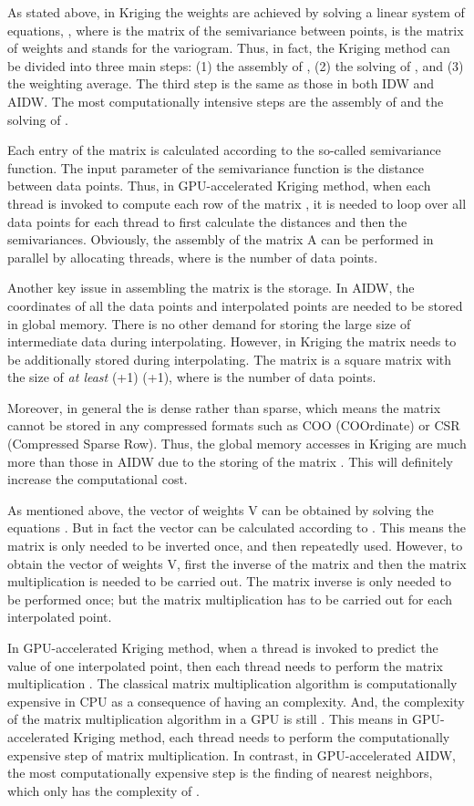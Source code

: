 \documentclass[fleqn,11pt]{wlscirep}
\begin{document}
As stated above, in Kriging the weights are achieved by solving a linear 
system of equations, , where  is the matrix of the semivariance 
between points,  is the matrix of weights and  stands for the variogram. 
Thus, in fact, the Kriging method can be divided into three main steps: (1) 
the assembly of , (2) the solving of , and (3) the weighting average. 
The third step is the same as those in both IDW and AIDW. The most 
computationally intensive steps are the assembly of  and the solving of .

Each entry of the matrix  is calculated according to the so-called 
semivariance function. The input parameter of the semivariance function is 
the distance between data points. Thus, in GPU-accelerated Kriging method, 
when each thread is invoked to compute each row of the matrix , it is 
needed to loop over all data points for each thread to first calculate the 
distances and then the semivariances. Obviously, the assembly of the matrix 
A can be performed in parallel by allocating  threads, where  is the number 
of data points.

Another key issue in assembling the matrix  is the storage. In AIDW, the 
coordinates of all the data points and interpolated points are needed to be 
stored in global memory. There is no other demand for storing the large size 
of intermediate data during interpolating. However, in Kriging the matrix  
needs to be additionally stored during interpolating. The matrix  is a 
square matrix with the size of \textit{at least} (+1) (+1), where  is the number of 
data points. 

Moreover, in general the  is dense rather than sparse, which means the 
matrix  cannot be stored in any compressed formats such as COO (COOrdinate) 
or CSR (Compressed Sparse Row). Thus, the global memory accesses in Kriging 
are much more than those in AIDW due to the storing of the matrix . This 
will definitely increase the computational cost. 

As mentioned above, the vector of weights V can be obtained by solving the 
equations . But in fact the vector can be calculated according to 
. This means the matrix  is only needed to be inverted once, and 
then repeatedly used. However, to obtain the vector of weights V, first the 
inverse of the matrix  and then the matrix multiplication is needed to be 
carried out. The matrix inverse is only needed to be performed once; but the 
matrix multiplication has to be carried out for each interpolated point.

In GPU-accelerated Kriging method, when a thread is invoked to predict the 
value of one interpolated point, then each thread needs to perform the 
matrix multiplication . The classical matrix multiplication 
algorithm is computationally expensive in CPU as a consequence of having an 
 complexity. And, the complexity of the matrix multiplication 
algorithm in a GPU is still  \cite{18}. This means 
in GPU-accelerated Kriging method, each thread needs to perform the 
computationally expensive step of matrix multiplication. In contrast, in 
GPU-accelerated AIDW, the most computationally expensive step is the finding 
of nearest neighbors, which only has the complexity of .
\end{document}
